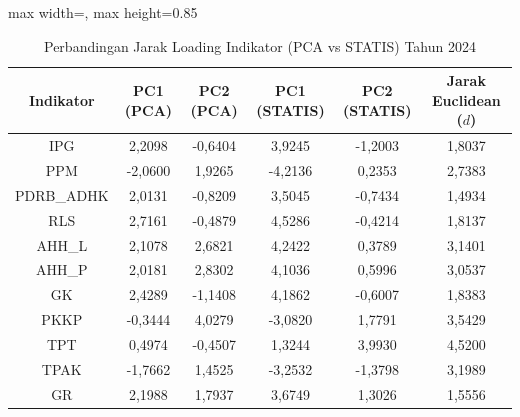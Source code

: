 \begin{table}[H]
\centering
\caption{Perbandingan Jarak Loading Indikator (PCA vs STATIS) Tahun 2024} \label{tab:app1jarak_loading_2024}
\begin{adjustbox}{max width=\textwidth, max height=0.85\textheight}
\begin{tabular}{|c|c|c|c|c|c|}
\hline
\textbf{Indikator} & \textbf{PC1 (PCA)} & \textbf{PC2 (PCA)} & \textbf{PC1 (STATIS)} & \textbf{PC2 (STATIS)} & \textbf{Jarak Euclidean ($d$)} \\
\hline
IPG & 2,2098 & -0,6404 & 3,9245 & -1,2003 & 1,8037 \\
PPM & -2,0600 & 1,9265 & -4,2136 & 0,2353 & 2,7383 \\
PDRB\_ADHK & 2,0131 & -0,8209 & 3,5045 & -0,7434 & 1,4934 \\
RLS & 2,7161 & -0,4879 & 4,5286 & -0,4214 & 1,8137 \\
AHH\_L & 2,1078 & 2,6821 & 4,2422 & 0,3789 & 3,1401 \\
AHH\_P & 2,0181 & 2,8302 & 4,1036 & 0,5996 & 3,0537 \\
GK & 2,4289 & -1,1408 & 4,1862 & -0,6007 & 1,8383 \\
PKKP & -0,3444 & 4,0279 & -3,0820 & 1,7791 & 3,5429 \\
TPT & 0,4974 & -0,4507 & 1,3244 & 3,9930 & 4,5200 \\
TPAK & -1,7662 & 1,4525 & -3,2532 & -1,3798 & 3,1989 \\
GR & 2,1988 & 1,7937 & 3,6749 & 1,3026 & 1,5556 \\
\hline
\end{tabular}
\end{adjustbox}
\end{table}